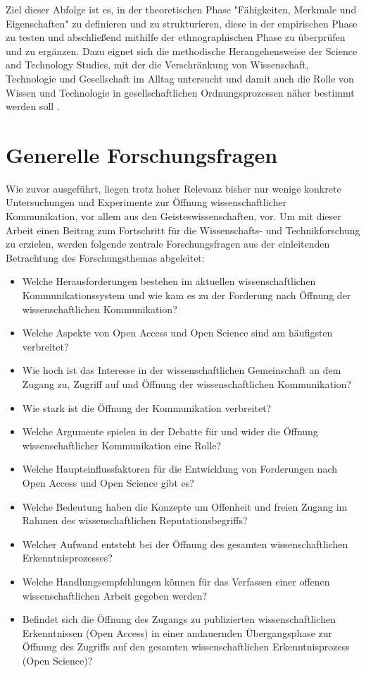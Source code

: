 Ziel dieser Abfolge ist es, in der theoretischen Phase "Fähigkeiten, Merkmale und Eigenschaften" \cite{raab_2012_fragebogen} zu definieren und zu strukturieren, diese in der empirischen Phase zu testen und abschließend mithilfe der ethnographischen Phase zu überprüfen und zu ergänzen. Dazu eignet sich die methodische Herangehensweise der Science and Technology Studies, mit der die Verschränkung von Wissenschaft, Technologie und Gesellschaft im Alltag untersucht und damit auch die Rolle von Wissen und Technologie in gesellschaftlichen Ordnungsprozessen näher bestimmt werden soll \cite{beck_2014_science}.

\section{Generelle Forschungsfragen}

Wie zuvor ausgeführt, liegen trotz hoher Relevanz bisher nur wenige konkrete Untersuchungen und Experimente zur Öffnung wissenschaftlicher Kommunikation, vor allem aus den Geisteswissenschaften, vor. Um mit dieser Arbeit einen Beitrag zum Fortschritt für die Wissenschafts- und Technikforschung zu erzielen, werden folgende zentrale Forschungsfragen aus der einleitenden Betrachtung des Forschungsthemas abgeleitet:
\begin{itemize}
\item Welche Herausforderungen bestehen im aktuellen wissenschaftlichen Kommunikationssystem und wie kam es zu der Forderung nach Öffnung der wissenschaftlichen Kommunikation?
\item Welche Aspekte von Open Access und Open Science sind am häufigsten verbreitet?
\item Wie hoch ist das Interesse in der wissenschaftlichen Gemeinschaft an dem Zugang zu, Zugriff auf und Öffnung der wissenschaftlichen Kommunikation?
\item Wie stark ist die Öffnung der Kommunikation verbreitet?
\item Welche Argumente spielen in der Debatte für und wider die Öffnung wissenschaftlicher Kommunikation eine Rolle?
\item Welche Haupteinflussfaktoren für die Entwicklung von Forderungen nach Open Access und Open Science gibt es?
\item Welche Bedeutung haben die Konzepte um Offenheit und freien Zugang im Rahmen des wissenschaftlichen Reputationsbegriffs?
\item Welcher Aufwand entsteht bei der Öffnung des gesamten wissenschaftlichen Erkenntnisprozesses?
\item Welche Handlungsempfehlungen können für das Verfassen einer offenen wissenschaftlichen Arbeit gegeben werden?
\item Befindet sich die Öffnung des Zugangs zu publizierten wissenschaftlichen Erkenntnissen (Open Access) in einer andauernden Übergangsphase zur Öffnung des Zugriffs auf den gesamten wissenschaftlichen Erkenntnisprozess (Open Science)?
\end{itemize}

